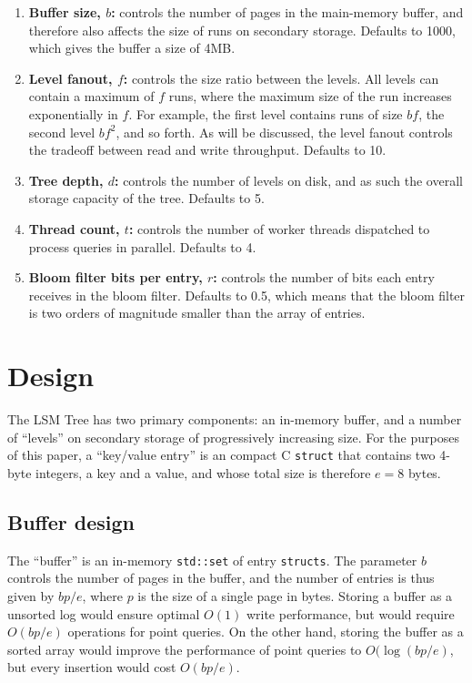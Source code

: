 \documentclass{acm}
\begin{document}
\pagebreak

\begin{enumerate}
\item \textbf{Buffer size, $b$:} controls the number of pages in the main-memory buffer, and therefore also affects the size of runs on secondary storage. Defaults to 1000, which gives the buffer a size of 4MB.
\item \textbf{Level fanout, $f$:} controls the size ratio between the levels. All levels can contain a maximum of $f$ runs, where the maximum size of the run increases exponentially in $f$. For example, the first level contains runs of size $bf$, the second level $bf^2$, and so forth. As will be discussed, the level fanout controls the tradeoff between read and write throughput. Defaults to 10.
\item \textbf{Tree depth, $d$:} controls the number of levels on disk, and as such the overall storage capacity of the tree. Defaults to 5.
\item \textbf{Thread count, $t$:} controls the number of worker threads dispatched to process queries in parallel. Defaults to 4.
\item \textbf{Bloom filter bits per entry, $r$:} controls the number of bits each entry receives in the bloom filter. Defaults to 0.5, which means that the bloom filter is two orders of magnitude smaller than the array of entries.
\end{enumerate}

\section{Design}

The LSM Tree has two primary components: an in-memory buffer, and a number of ``levels'' on secondary storage of progressively increasing size. For the purposes of this paper, a ``key/value entry'' is an compact C \texttt{struct} that contains two 4-byte integers, a key and a value, and whose total size is therefore $e=8$ bytes.

\subsection{Buffer design}

The ``buffer'' is an in-memory \texttt{std::set} of entry \texttt{structs}. The parameter $b$ controls the number of pages in the buffer, and the number of entries is thus given by $bp/e$, where $p$ is the size of a single page in bytes. Storing a buffer as a unsorted log would ensure optimal $O(1)$ write performance, but would require $O(bp/e)$ operations for point queries. On the other hand, storing the buffer as a sorted array would improve the performance of point queries to $O(\log(bp/e)$, but every insertion would cost $O(bp/e)$.
\end{document}
